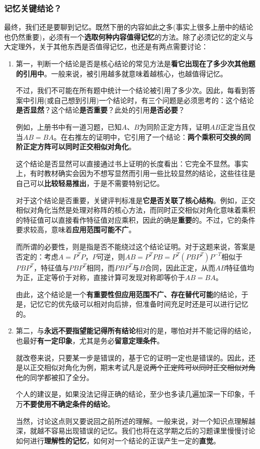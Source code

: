 \documentclass[a4paper,UTF8,fontset=windows,AutoFakeBold]{ctexart}
\begin{document}
\subsubsection{记忆关键结论？}
最终，我们还是要聊到记忆。既然下册的内容如此之多(事实上很多上册中的结论也仍然重要)，必须有一个\textbf{选取何种内容值得记忆}的方法。除了必须记忆的定义与大定理外，关于其他东西是否值得记忆，也还是有两点需要讨论：
\begin{enumerate}
    \item 第一，判断一个结论是否是核心结论的常见方法是\textbf{看它出现在了多少次其他题的引用中}。一般来说，被引用越多就意味着越核心，也越值得记忆。
    
    不过，我们不可能在所有题中统计一个结论被引用了多少次。因此，每看到答案中引用(或自己想到引用)一个结论时，有三个问题是必须思考的：这个结论\textbf{是否显然}？这个结论\textbf{是否重要}？此处的引用\textbf{是否必要}？

    例如，上册书中有一道习题，已知$A$、$B$为同阶正定方阵，证明$AB$正定当且仅当$AB=BA$。在右推左的证明中，它引用了一个结论：\textbf{两个乘积可交换的同阶正定方阵可以同时正交相似对角化}。

    这个结论是否显然可以直接通过书上证明的长度看出：它完全不显然。事实上，有时教材确实会因为不想写显然而引用一些比较显然的结论，这些往往是自己可以\textbf{比较轻易推出}，于是不需要特别记忆。

    对于这个结论是否重要，关键评判标准是\textbf{它是否关联了核心结构}。例如，正交相似对角化当然是处理对称阵的核心方法，而同时正交相似对角化意味着乘积的特征值可以直接看作特征值对应乘积，因此的确是\textbf{重要}的。不过，它的条件要求较高，意味着\textbf{应用范围可能不广}。

    而所谓的必要性，则是指是否不能绕过这个结论证明。对于这题来说，答案是否定的：考虑$A=P^TP$，$P$可逆，则$AB=P^TPB=P^T(PBP^T)P^{-T}$相似于$PBP^T$，特征值与$PBP^T$相同，而$PBP^T$与$B$合同，因此正定，从而$AB$特征值均为正，正定等价于对称，直接计算可发现对称即等价于$AB=BA$。

    由此，这个结论是一个\textbf{有重要性但应用范围不广、存在替代可能}的结论，于是，记忆它的优先级可以相对向后排，但准备时间充足时还是可以进行记忆的。

    \item 第二，与\textbf{永远不要指望能记得所有结论}相对的是，哪怕对并不能记得的结论，也最好\textbf{有一定印象}，尤其是务必\textbf{留意定理条件}。
    
    就改卷来说，只要某一步是错误的，基于它的证明一定也是错误的。因此，还是以正交相似对角化为例，期末考试凡是说\sout{两个正定阵可以同时正交相似对角化}的同学都被扣了全分。

    个人的建议是，如果没法记得正确的结论，至少也多读几遍加深一下印象，千万\textbf{不要使用不确定条件的结论}。

    当然，讨论这点则又要说回之前所述的理解。一般来说，对一个知识点理解越深，就越不容易出现错误的记忆。我们也将在这学期之后的习题课里慢慢讨论如何进行\textbf{理解性的记忆}，如何对一个结论的正误产生一定的\textbf{直觉}。
\end{enumerate}
\end{document}
